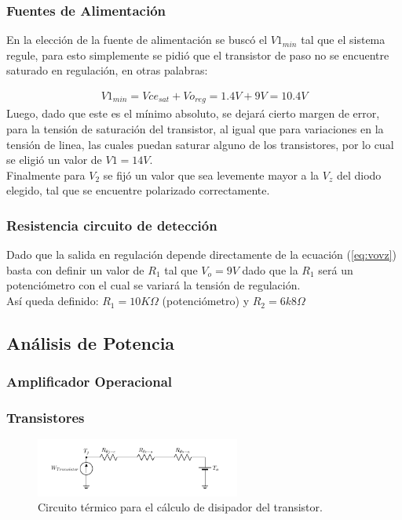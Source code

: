 \subsubsection{Fuentes de Alimentación}
\label{sec:fuentes}
En la elección de la fuente de alimentación se buscó el $V1_{min}$ tal que el sistema regule, para esto simplemente se pidió que el transistor de paso no se encuentre saturado en regulación, en otras palabras:

\begin{align}
V1_{min}=Vce_{sat}+Vo_{reg}= 1.4V+9V=10.4V
\end{align}
Luego, dado que este es el mínimo absoluto, se dejará cierto margen de error, para la tensión de saturación del transistor, al igual que para variaciones en la tensión de linea, las cuales puedan saturar alguno de los transistores, por lo cual se eligió un valor de $V1=14V$.\\
Finalmente para $V_2$ se fijó un valor que sea levemente mayor a la $V_z$ del diodo elegido, tal que se encuentre polarizado correctamente.

\subsubsection{Resistencia circuito de detección}
\label{sec:resdet}
Dado que la salida en regulación depende directamente de la ecuación (\ref{eq:vovz}) basta con definir un valor de $R_1$ tal que $V_o=9V$ dado que la $R_1$ será un potenciómetro con el cual se variará la tensión de regulación.\\ Así queda definido: $R_1= 10K \Omega$ (potenciómetro) y $R_2=6k8\Omega$


\subsection{Análisis de Potencia}
\subsubsection{Amplificador Operacional}
\subsubsection{Transistores}

\begin{figure}[H]
\centering
	\includegraphics[width=0.6\textwidth, page=1]{ImagenesEjercicio2/Potencia - Transistor.pdf}
	\caption{Circuito térmico para el cálculo de disipador del transistor.}
	\label{fig:circuitopottrans}
\end{figure}


